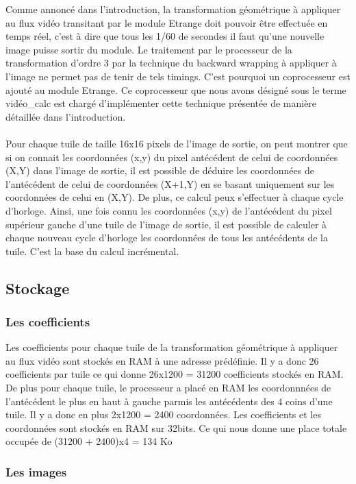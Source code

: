 {{Comme annoncé dans l'introduction, la transformation géométrique à appliquer au flux vidéo transitant par le module Etrange doit pouvoir être effectuée en temps réel, c'est à dire que tous les 1/60 de secondes il faut qu'une nouvelle image puisse sortir du module. Le traitement par le processeur de la transformation d'ordre 3 par la technique du backward wrapping  à appliquer à l'image ne permet pas de tenir de tels timings. C'est pourquoi un coprocesseur est ajouté au module Etrange. Ce coprocesseur que nous avons désigné sous le terme vidéo\_calc est chargé d'implémenter cette technique présentée de manière détaillée dans l'introduction.
\\
\\
Pour chaque tuile de taille 16x16 pixels de l'image de sortie, on peut montrer que si on connait les coordonnées (x,y) du pixel antécédent de celui de coordonnées (X,Y) dans l'image de sortie, il est possible de déduire les coordonnées de l'antécédent de celui de coordonnées (X+1,Y) en se basant uniquement sur les coordonnées de celui en (X,Y). De plus, ce calcul peux s'effectuer à chaque cycle d'horloge. 
Ainsi, une fois connu les coordonnées (x,y) de l'antécédent du pixel supérieur gauche d'une tuile de l'image de sortie, il est possible de calculer à chaque nouveau cycle d'horloge les coordonnées de tous les antécédents de la tuile. C'est la base du calcul incrémental.

	\subsection{Stockage}
	
		\subsubsection*{Les coefficients}
		
Les coefficients pour chaque tuile de la transformation géométrique à appliquer au flux vidéo sont stockés en RAM à une adresse prédéfinie. Il y a donc 26 coefficients par tuile
ce qui donne 26x1200 = 31200 coefficients stockés en RAM. De plus pour chaque tuile, le processeur a placé en RAM les coordonnnées de l'antécédent le plus en haut à gauche parmis les antécédents des 4 coins d'une tuile. Il y a donc en plus 2x1200 = 2400 coordonnées.
Les coefficients et les coordonnées sont stockés en RAM sur 32bits. Ce qui nous donne une place totale occupée de (31200 + 2400)x4 = 134 Ko

	\subsubsection*{Les images}
	
}}
